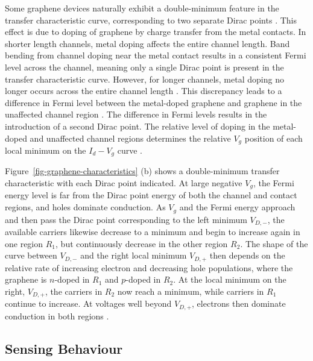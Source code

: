 \documentclass[
  a4paper,
]{scrbook}
\begin{document}
Some graphene devices naturally exhibit a double-minimum feature in the
transfer characteristic curve, corresponding to two separate Dirac
points \autocite{Bartolomeo2011,Feng2014,Zhang2015,Kireev2017,Peng2018}.
This effect is due to doping of graphene by charge transfer from the
metal contacts. In shorter length channels, metal doping affects the
entire channel length. Band bending from channel doping near the metal
contact results in a consistent Fermi level across the channel, meaning
only a single Dirac point is present in the transfer characteristic
curve. However, for longer channels, metal doping no longer occurs
across the entire channel length \autocite{Bartolomeo2011,Peng2018}.
This discrepancy leads to a difference in Fermi level between the
metal-doped graphene and graphene in the unaffected channel region
\autocite{Bartolomeo2011,Feng2014,Peng2018,Zhang2015}. The difference in
Fermi levels results in the introduction of a second Dirac point. The
relative level of doping in the metal-doped and unaffected channel
regions determines the relative \(V_g\) position of each local minimum
on the \(I_d - V_g\) curve \autocite{Bartolomeo2011,Peng2018,Zhang2015}.

Figure~\ref{fig-graphene-characteristics} (b) shows a double-minimum
transfer characteristic with each Dirac point indicated. At large
negative \(V_g\), the Fermi energy level is far from the Dirac point
energy of both the channel and contact regions, and holes dominate
conduction. As \(V_g\) and the Fermi energy approach and then pass the
Dirac point corresponding to the left minimum \(V_{D,-}\), the available
carriers likewise decrease to a minimum and begin to increase again in
one region \(R_1\), but continuously decrease in the other region
\(R_2\). The shape of the curve between \(V_{D,-}\) and the right local
minimum \(V_{D,+}\) then depends on the relative rate of increasing
electron and decreasing hole populations, where the graphene is
\(n\)-doped in \(R_1\) and \(p\)-doped in \(R_2\). At the local minimum
on the right, \(V_{D,+}\), the carriers in \(R_2\) now reach a minimum,
while carriers in \(R_1\) continue to increase. At voltages well beyond
\(V_{D,+}\), electrons then dominate conduction in both regions
\autocite{Bartolomeo2011,Zhang2015,Peng2018}.

\hypertarget{sensing-behaviour}{%
\subsection{Sensing Behaviour}\label{sensing-behaviour}}
\end{document}
